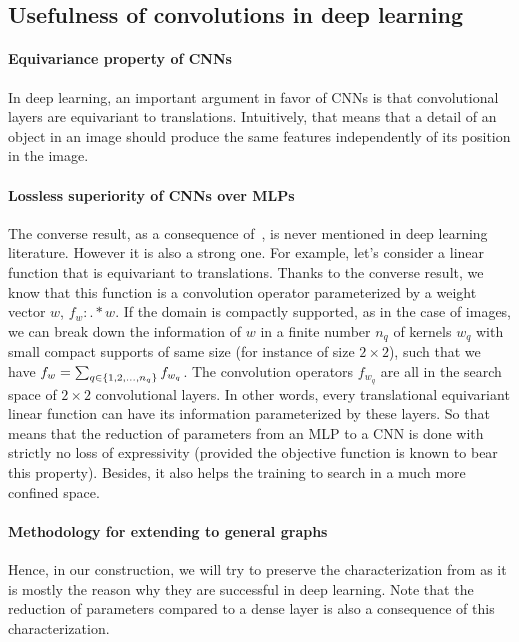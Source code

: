 \subsection{Usefulness of convolutions in deep learning}
\label{sec:cnnvsmlp}

\paragraph{Equivariance property of CNNs}
In deep learning, an important argument in favor of CNNs is that convolutional layers are equivariant to translations. Intuitively, that means that a detail of an object in an image should produce the same features independently of its position in the image.

\paragraph{Lossless superiority of CNNs over MLPs}
The converse result, as a consequence of~, is never mentioned in deep learning literature. However it is also a strong one. For example, let's consider a linear function that is equivariant to translations. Thanks to the converse result, we know that this function is a convolution operator parameterized by a weight vector $w$, $f_w : . \ast w$. If the domain is compactly supported, as in the case of images, we can break down the information of $w$ in a finite number $n_q$ of kernels $w_q$  with small compact supports of same size (for instance of size $2 \times 2$), such that we have $f_w = \sum_{q \in \{1, 2, \ldots, n_q\}} f_{w_q}$. The convolution operators $f_{w_q}$ are all in the search space of $2 \times 2$ convolutional layers. In other words, every translational equivariant linear function can have its information parameterized by these layers. So that means that the reduction of parameters from an MLP to a CNN is done with strictly no loss of expressivity (provided the objective function is known to bear this property). Besides, it also helps the training to search in a much more confined space.

\paragraph{Methodology for extending to general graphs}
Hence, in our construction, we will try to preserve the characterization from  as it is mostly the reason why they are successful in deep learning. Note that the reduction of parameters compared to a dense layer is also a consequence of this characterization.







